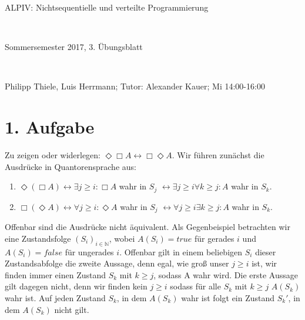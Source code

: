 \documentclass[numbers=noendperiod]{scrartcl}
\begin{document}
	
	
\hrulefill
\begin{center}
	\bfseries %
	\sffamily %
	\begin{huge}
		ALPIV: Nichtsequentielle und verteilte Programmierung
	\end{huge}\\
	\begin{Large}
		Sommersemester 2017, 3. Übungsblatt
	\end{Large}\\
	\begin{small}
		Philipp Thiele, Luis Herrmann; Tutor: Alexander Kauer; Mi 14:00-16:00
	\end{small}
	
	\vspace{-10pt}
\end{center}
\hrulefill

\newcommand{\inputmintedframed}[2]{
	\begin{mdframed}[linecolor=bg,backgroundcolor=bg]
		\inputminted[mathescape,breaklines,linenos,numbersep=5pt,tabsize=3]{#1}{#2}
\end{mdframed}}

\section*{1. Aufgabe}

Zu zeigen oder widerlegen: $ \Diamond \Box A \leftrightarrow \Box \Diamond A$. Wir führen zunächst die Ausdrücke in Quantorensprache aus:
\begin{enumerate}
	\item $\Diamond (\Box A) \leftrightarrow \exists j \ge i: \Box A $ wahr in $S_j$ $\leftrightarrow \exists j \ge i \forall k \ge j : A $ wahr in $S_k$.
	
	\item $\Box (\Diamond A) \leftrightarrow \forall j \ge i : \Diamond A$ wahr in $S_j$ $\leftrightarrow \forall j \ge i \exists k \ge j : A$ wahr in $S_k$.
\end{enumerate}


Offenbar sind die Ausdrücke nicht äquivalent. Als Gegenbeispiel betrachten wir eine Zustandsfolge $(S_i)_{i\in \mathbb{N}}$, wobei $A(S_i) = true$ für gerades $i$ und $A(S_i) = false$ für ungerades $i$. Offenbar gilt in einem beliebigen $S_i$ dieser Zustandsabfolge die zweite Aussage, denn egal, wie groß unser $j \ge i$ ist, wir finden immer einen Zustand $S_k$ mit $k \ge j$, sodass A wahr wird. 
Die erste Aussage gilt dagegen nicht, denn wir finden kein $j \ge i$ sodass für alle $S_k$ mit $k \ge j$ $A(S_k)$ wahr ist. Auf jeden Zustand $S_k$, in dem $A(S_k)$ wahr ist folgt ein Zustand $S_k'$, in dem $A(S_k)$ nicht gilt.
\end{document}
